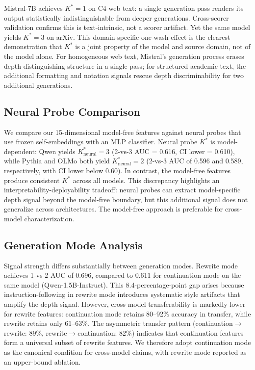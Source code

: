 \documentclass[11pt,a4paper]{article}
\newcommand{\Kstar}{K^{*}}
\begin{document}
Mistral-7B achieves $\Kstar = 1$ on C4 web text: a single generation pass renders its output statistically indistinguishable from deeper generations. Cross-scorer validation confirms this is text-intrinsic, not a scorer artifact. Yet the same model yields $\Kstar = 3$ on arXiv. This domain-specific one-wash effect is the clearest demonstration that $\Kstar$ is a joint property of the model and source domain, not of the model alone. For homogeneous web text, Mistral's generation process erases depth-distinguishing structure in a single pass; for structured academic text, the additional formatting and notation signals rescue depth discriminability for two additional generations.

\subsection{Neural Probe Comparison}
\label{sec:neural-probe}

We compare our 15-dimensional model-free features against neural probes that use frozen self-embeddings with an MLP classifier. Neural probe $\Kstar$ is model-dependent: Qwen yields $\Kstar_\text{neural} = 3$ (2-vs-3 AUC = 0.616, CI lower = 0.610), while Pythia and OLMo both yield $\Kstar_\text{neural} = 2$ (2-vs-3 AUC of 0.596 and 0.589, respectively, with CI lower below 0.60). In contrast, the model-free features produce consistent $\Kstar$ across all models. This discrepancy highlights an interpretability-deployability tradeoff: neural probes can extract model-specific depth signal beyond the model-free boundary, but this additional signal does not generalize across architectures. The model-free approach is preferable for cross-model characterization.

\subsection{Generation Mode Analysis}
\label{sec:genmode}

Signal strength differs substantially between generation modes. Rewrite mode achieves 1-vs-2 AUC of 0.696, compared to 0.611 for continuation mode on the same model (Qwen-1.5B-Instruct). This 8.4-percentage-point gap arises because instruction-following in rewrite mode introduces systematic style artifacts that amplify the depth signal. However, cross-model transferability is markedly lower for rewrite features: continuation mode retains 80--92\% accuracy in transfer, while rewrite retains only 61--63\%. The asymmetric transfer pattern (continuation$\to$rewrite: 89\%, rewrite$\to$continuation: 82\%) indicates that continuation features form a universal subset of rewrite features. We therefore adopt continuation mode as the canonical condition for cross-model claims, with rewrite mode reported as an upper-bound ablation.
\end{document}
